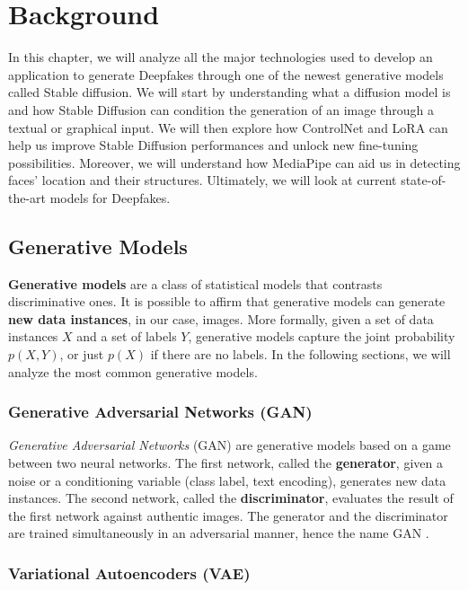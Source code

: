 \documentclass[preprint]{elsarticle}
\begin{document}
\section{Background}\label{ch:background}
In this chapter, we will analyze all the major technologies used to develop an application to generate 
Deepfakes through one of the newest generative models called Stable diffusion. 
We will start by understanding what a diffusion model is and how Stable Diffusion can condition the 
generation of an image through a textual or graphical input. 
We will then explore how ControlNet and LoRA can help us improve Stable Diffusion performances and unlock new fine-tuning possibilities. 
Moreover, we will understand how MediaPipe can aid us in detecting faces' location and their structures. 
Ultimately, we will look at current state-of-the-art models for Deepfakes.



\subsection{Generative Models} \label{sec:imggenmodels}
\textbf{Generative models} are a class of statistical models that contrasts discriminative ones. 
It is possible to affirm that generative models can generate \textbf{new data instances}, 
in our case, images. 
More formally, given a set of data instances $X$ and a set of labels $Y$, 
generative models capture the joint probability $p(X, Y)$, or just $p(X)$ if there are no labels. 
In the following sections, we will analyze the most common generative models.


\subsubsection{Generative Adversarial Networks (GAN)}\label{sec:gan}


\emph{Generative Adversarial Networks} (GAN) \cite{goodfellow2014generative} are generative models based on a game between two neural networks. 
The first network, called the \textbf{generator}, given a noise or a conditioning variable (class label, text encoding), generates new data instances. 
The second network, called the \textbf{discriminator}, evaluates the result of the first network against authentic images.
The generator and the discriminator are trained simultaneously in an adversarial manner, hence the name GAN
\cite{weng2019gan}.

\subsubsection{Variational Autoencoders (VAE)} \label{sec:vae}
\end{document}
